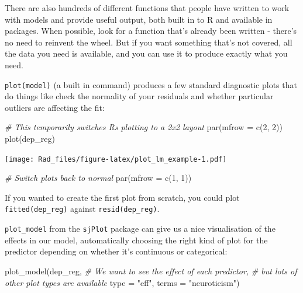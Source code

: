 \documentclass[
]{book}
\newenvironment{Shaded}{\begin{snugshade}}{\end{snugshade}}
\newcommand{\AttributeTok}[1]{\textcolor[rgb]{0.77,0.63,0.00}{#1}}
\newcommand{\CommentTok}[1]{\textcolor[rgb]{0.56,0.35,0.01}{\textit{#1}}}
\newcommand{\DecValTok}[1]{\textcolor[rgb]{0.00,0.00,0.81}{#1}}
\newcommand{\FunctionTok}[1]{\textcolor[rgb]{0.00,0.00,0.00}{#1}}
\newcommand{\NormalTok}[1]{#1}
\newcommand{\StringTok}[1]{\textcolor[rgb]{0.31,0.60,0.02}{#1}}
\begin{document}
There are also hundreds of different functions that people
have written to work with models and provide useful output,
both built in to R and available in packages. When possible,
look for a function that's already been written - there's no need
to reinvent the wheel. But if you want something that's not covered,
all the data you need is available, and you can use it to produce
exactly what you need.

\texttt{plot(model)}
(a built in command)
produces a few standard diagnostic plots that do things
like check the normality of your residuals and whether
particular outliers are affecting the fit:

\begin{Shaded}
\begin{Highlighting}[]
\CommentTok{\# This temporarily switches R\textquotesingle{}s plotting to a 2x2 layout}
\FunctionTok{par}\NormalTok{(}\AttributeTok{mfrow =} \FunctionTok{c}\NormalTok{(}\DecValTok{2}\NormalTok{, }\DecValTok{2}\NormalTok{))}
\FunctionTok{plot}\NormalTok{(dep\_reg)}
\end{Highlighting}
\end{Shaded}

\texttt{[image: Rad\_files/figure-latex/plot\_lm\_example-1.pdf]}

\begin{Shaded}
\begin{Highlighting}[]
\CommentTok{\# Switch plots back to normal}
\FunctionTok{par}\NormalTok{(}\AttributeTok{mfrow =} \FunctionTok{c}\NormalTok{(}\DecValTok{1}\NormalTok{, }\DecValTok{1}\NormalTok{))}
\end{Highlighting}
\end{Shaded}

\begin{note}
If you wanted to create the first plot from scratch, you could plot
\texttt{fitted(dep\_reg)} against \texttt{resid(dep\_reg)}.
\end{note}

\texttt{plot\_model} from the \texttt{sjPlot} package can give
us a nice visualisation of the effects in our model, automatically
choosing the right kind of plot for the predictor depending on
whether it's continuous or categorical:

\begin{Shaded}
\begin{Highlighting}[]
\FunctionTok{plot\_model}\NormalTok{(dep\_reg, }
           \CommentTok{\# We want to see the effect of each predictor,}
           \CommentTok{\#   but lots of other plot types are available}
           \AttributeTok{type =} \StringTok{"eff"}\NormalTok{,}
           \AttributeTok{terms =} \StringTok{"neuroticism"}\NormalTok{)}
\end{Highlighting}
\end{Shaded}
\end{document}
